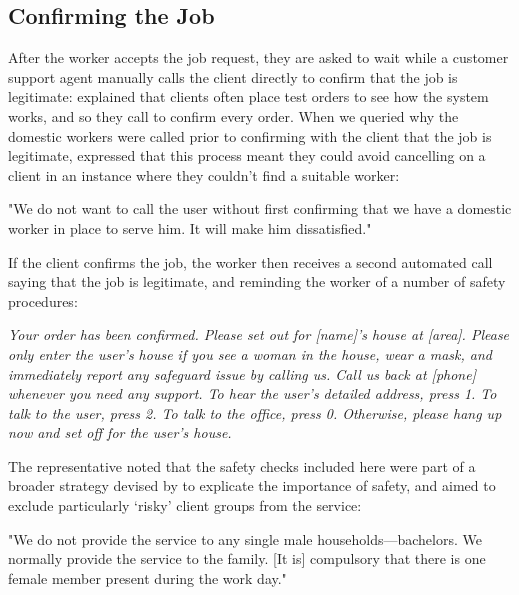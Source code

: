 \subsection{Confirming the Job}

After the worker accepts the job request, they are asked to wait while a \PC{} customer support agent manually calls the client directly to confirm that the job is legitimate: \PC{} explained that clients often place test orders to see how the system works, and so they call to confirm every order. When we queried why the domestic workers were called prior to confirming with the client that the job is legitimate, \PC{} expressed that this process meant they could avoid cancelling on a client in an instance where they couldn't find a suitable worker:

\begin{displayquote}
"We do not want to call the user without first confirming that we have a domestic worker in place to serve him. It will make him dissatisfied." 
\end{displayquote}

If the client confirms the job, the worker then receives a second automated call saying that the job is legitimate, and reminding the worker of a number of safety procedures: 

\begin{displayquote}
\textit{Your order has been confirmed. Please set out for [name]’s house at [area]. Please only enter the user’s house if you see a woman in the house, wear a mask, and immediately report any safeguard issue by calling us. Call us back at [phone] whenever you need any support. To hear the user's detailed address, press 1. To talk to the user, press 2. To talk to the office, press 0. Otherwise, please hang up now and set off for the user’s house.}
\end{displayquote}

The \NGO{} representative noted that the safety checks included here were part of a broader strategy devised by \NGO{} to explicate the importance of safety, and aimed to exclude particularly `risky' client groups from the service:

\begin{displayquote}
"We do not provide the service to any single male households---bachelors. We normally provide the service to the family. [It is] compulsory that there is one female member present during the work day."
\end{displayquote}


